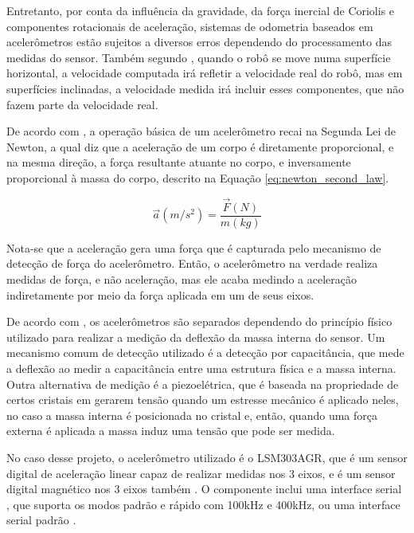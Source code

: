 \documentclass[acronym, symbols, table]{fei}
\begin{document}
				Entretanto, por conta da influência da gravidade, da força inercial de Coriolis \cite{persson1998we} e componentes rotacionais de aceleração, sistemas de odometria baseados em acelerômetros estão sujeitos a diversos erros dependendo do processamento das medidas do sensor. Também segundo \textcite{NISTLER2011413}, quando o robô se move numa superfície horizontal, a velocidade computada irá refletir a velocidade real do robô, mas em superfícies inclinadas, a velocidade medida irá incluir esses componentes, que não fazem parte da velocidade real.
			
				De acordo com \textcite{dadafshar2014accelerometer}, a operação básica de um acelerômetro recai na Segunda Lei de Newton, a qual diz que a aceleração de um corpo é diretamente proporcional, e na mesma direção, a força resultante atuante no corpo, e inversamente proporcional à massa do corpo, descrito na Equação \ref{eq:newton_second_law}.
				
				\begin{equation}\label{eq:newton_second_law}
					\overrightarrow{a}(m/s^2) = \frac{\overrightarrow{F}(N)}{m(kg)}
				\end{equation}
			
				Nota-se que a aceleração gera uma força que é capturada pelo mecanismo de detecção de força do acelerômetro. Então, o acelerômetro na verdade realiza medidas de força, e não aceleração, mas ele acaba medindo a aceleração indiretamente por meio da força aplicada em um de seus eixos.
				
				De acordo com \textcite{siegwart2011introduction}, os acelerômetros são separados dependendo do princípio físico utilizado para realizar a medição da deflexão da massa interna do sensor. Um mecanismo comum de detecção utilizado é a detecção por capacitância, que mede a deflexão ao medir a capacitância entre uma estrutura física e a massa interna. Outra alternativa de medição é a piezoelétrica, que é baseada na propriedade de certos cristais em gerarem tensão quando um estresse mecânico é aplicado neles, no caso a massa interna é posicionada no cristal e, então, quando uma força externa é aplicada a massa induz uma tensão que pode ser medida.
				
				No caso desse projeto, o acelerômetro utilizado é o LSM303AGR, que é um sensor digital de aceleração linear capaz de realizar medidas nos 3 eixos, e é um sensor digital magnético nos 3 eixos também \cite{datasheet_accel}. O componente inclui uma interface serial , que suporta os modos padrão e rápido com 100kHz e 400kHz, ou uma interface serial padrão .
				
\end{document}
